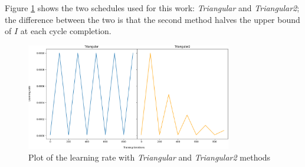 Figure \ref{fig:triangular} shows the two schedules used for this work: \emph{Triangular} and \emph{Triangular2};
the difference between the two is that the second method halves the upper bound of $I$ at each cycle completion.
\begin{figure}[ht!]
\centering
\includegraphics[width=0.8\textwidth]{images/triangular.png} 
\caption{Plot of the learning rate with \emph{Triangular} and \emph{Triangular2} methods}
\label{fig:triangular}
\end{figure}









